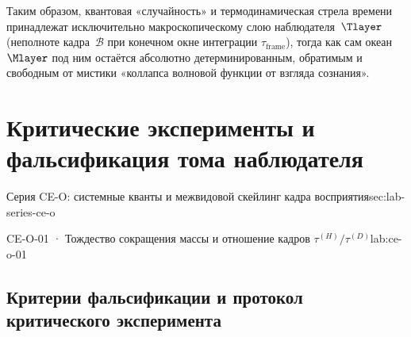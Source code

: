 Таким образом, квантовая «случайность» и термодинамическая стрела времени принадлежат исключительно макроскопическому слою наблюдателя~$\Tlayer$ (неполноте кадра~$\mathcal{B}$ при конечном окне интеграции $\tau_{\mathrm{frame}}$), тогда как сам океан~$\Mlayer$ под ним остаётся абсолютно детерминированным, обратимым и свободным от мистики «коллапса волновой функции от взгляда сознания».





\chapter{Критические эксперименты и фальсификация тома наблюдателя}
\label{ch:observer-critical-experiments}

\begin{labseries}{Серия CE-O: системные кванты и межвидовой скейлинг кадра восприятия}{sec:lab-series-ce-o}
\begin{labrecord}{CE-O-01 · Тождество сокращения массы и отношение кадров \texorpdfstring{$\tau^{(H)}/\tau^{(D)}$}{tau(H)/tau(D)}}{lab:ce-o-01}

\end{labrecord}
\end{labseries}

\section{Критерии фальсификации и протокол критического эксперимента}
\label{sec:observer-falsification}

